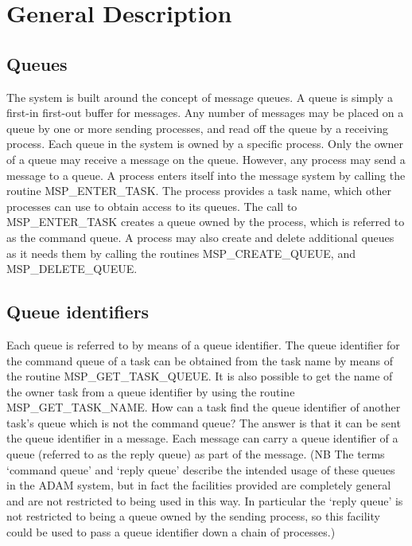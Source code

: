 \section{General Description}

\subsection{Queues}

The system is built around the concept of message queues. A queue is
simply a first-in first-out buffer for messages. Any number of messages may
be placed on a queue by one or more sending processes, and read off the
queue by a receiving process. Each queue in the system is owned by a
specific process. Only the owner of a queue may receive a message on
the queue. However, any process may send a message to a queue. A process enters
itself into the message system by calling the routine MSP\_ENTER\_TASK. The
process provides a task name, which other processes can use to obtain
access to its queues. The call to MSP\_ENTER\_TASK creates a queue owned
by the process, which is referred to as the command queue. A process may
also create and delete additional queues as it needs them by calling
the routines MSP\_CREATE\_QUEUE, and MSP\_DELETE\_QUEUE.

\subsection{Queue identifiers}

Each queue is referred to by means of a queue identifier. The
queue identifier for the command queue of a task can be obtained from
the task name by means of the routine MSP\_GET\_TASK\_QUEUE. It is also
possible to get the name of the owner task from a queue identifier by using
the routine MSP\_GET\_TASK\_NAME. How can a task find the queue identifier
of another task's queue which is not the command queue? The answer is that it 
can be sent the queue identifier in a message. Each message can carry a queue
identifier of a queue (referred to as the reply queue) as part of the message.
(NB The terms `command queue' and `reply queue' describe the intended usage
of these queues in the ADAM system, but in fact the facilities provided are
completely general and are not restricted to being used in this way. In 
particular the `reply queue' is not restricted to being a queue owned by the
sending process, so this facility could be used to pass a queue identifier
down a chain of processes.) 

